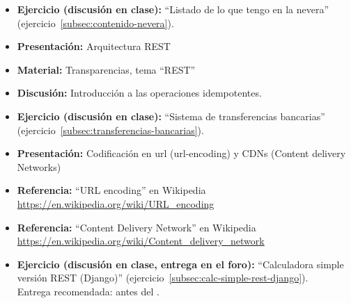\documentclass[a4paper,12pt]{article}
\begin{document}
\begin{itemize}
\item \textbf{Ejercicio (discusión en clase):} ``Listado de lo que tengo en la nevera'' (ejercicio~\ref{subsec:contenido-nevera}). 
\item \textbf{Presentación:} Arquitectura REST
\item \textbf{Material:} Transparencias, tema ``REST''
\item \textbf{Discusión:} Introducción a las operaciones idempotentes.
\item \textbf{Ejercicio (discusión en clase):} ``Sistema de transferencias bancarias'' (ejercicio~\ref{subsec:transferencias-bancarias}).
\item \textbf{Presentación:} Codificación en url (url-encoding) y CDNs (Content delivery Networks)
\item \textbf{Referencia:} ``URL encoding'' en Wikipedia \\ \url{https://en.wikipedia.org/wiki/URL_encoding}
\item \textbf{Referencia:} ``Content Delivery Network'' en Wikipedia \\ \url{https://en.wikipedia.org/wiki/Content_delivery_network}
\item \textbf{Ejercicio (discusión en clase, entrega en el foro):} ``Calculadora simple versión REST (Django)'' (ejercicio~\ref{subsec:calc-simple-rest-django}). \\
  Entrega recomendada: antes del \juevesH.
\end{itemize}




\end{document}
